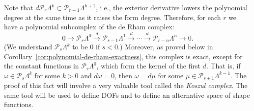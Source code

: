 {Note that $d\mathcal P_r\Lambda^k\subset\mathcal P_{r-1}\Lambda^{k+1}$, i.e., the exterior derivative lowers the polynomial degree at the same time as it raises the form degree. Therefore, for each $r$ we have a polynomial subcomplex of the de Rham complex:}
\[
0\to\mathcal P_r\Lambda^0\xrightarrow{d}\mathcal P_{r-1}\Lambda^1\xrightarrow{d}\cdots\xrightarrow{d}\mathcal P_{r-n}\Lambda^n\to0.
\]
{(We understand $\mathcal P_s\Lambda^k$ to be $0$ if $s<0$.) Moreover, as proved below in Corollary~\ref{cor:polynomial-de-rham-exactness}, this complex is exact, except for the constant functions in $\mathcal P_r\Lambda^0$, which form the kernel of the first $d$. That is, if $\omega\in\mathcal P_s\Lambda^k$ for some $k>0$ and $d\omega=0$, then $\omega=d\mu$ for some $\mu\in\mathcal P_{s+1}\Lambda^{k-1}$. The proof of this fact will involve a very valuable tool called the \emph{Koszul complex}. The same tool will be used to define DOFs and to define an alternative space of shape functions.}
